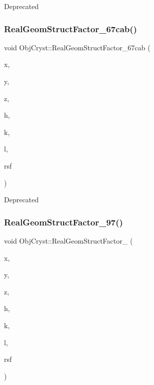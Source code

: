 \begin{DoxyRefDesc}{Deprecated}
\item[\mbox{\hyperlink{deprecated__deprecated000010}{Deprecated}}]\end{DoxyRefDesc}
\mbox{\label{namespace_obj_cryst_ab7b9de18fea72394b7bd491927039d0d}} 
\subsubsection{\texorpdfstring{RealGeomStructFactor\_67cab()}{RealGeomStructFactor\_67cab()}}
{\footnotesize\ttfamily void Obj\+Cryst\+::\+Real\+Geom\+Struct\+Factor\+\_\+67cab (\begin{DoxyParamCaption}\item[{const R\+E\+AL}]{x,  }\item[{const R\+E\+AL}]{y,  }\item[{const R\+E\+AL}]{z,  }\item[{const Cryst\+Vector\+\_\+\+R\+E\+AL \&}]{h,  }\item[{const Cryst\+Vector\+\_\+\+R\+E\+AL \&}]{k,  }\item[{const Cryst\+Vector\+\_\+\+R\+E\+AL \&}]{l,  }\item[{Cryst\+Vector\+\_\+\+R\+E\+AL \&}]{rsf }\end{DoxyParamCaption})}

\begin{DoxyRefDesc}{Deprecated}
\item[\mbox{\hyperlink{deprecated__deprecated000008}{Deprecated}}]\end{DoxyRefDesc}
\mbox{\label{namespace_obj_cryst_a285e4956720497c97bf24cd3886bb6fa}} 
\subsubsection{\texorpdfstring{RealGeomStructFactor\_97()}{RealGeomStructFactor\_97()}}
{\footnotesize\ttfamily void Obj\+Cryst\+::\+Real\+Geom\+Struct\+Factor\+\_ (\begin{DoxyParamCaption}\item[{const R\+E\+AL}]{x,  }\item[{const R\+E\+AL}]{y,  }\item[{const R\+E\+AL}]{z,  }\item[{const Cryst\+Vector\+\_\+\+R\+E\+AL \&}]{h,  }\item[{const Cryst\+Vector\+\_\+\+R\+E\+AL \&}]{k,  }\item[{const Cryst\+Vector\+\_\+\+R\+E\+AL \&}]{l,  }\item[{Cryst\+Vector\+\_\+\+R\+E\+AL \&}]{rsf }\end{DoxyParamCaption})}

